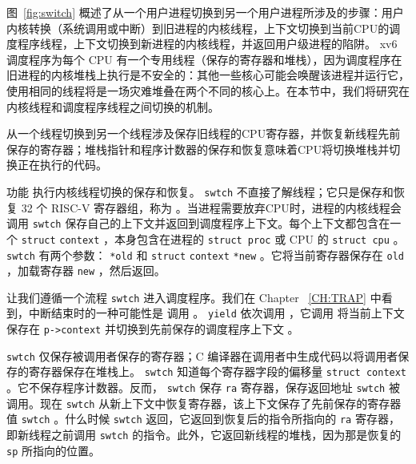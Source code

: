 图~\ref{fig:switch}   概述了从一个用户进程切换到另一个用户进程所涉及的步骤：用户内核转换（系统调用或中断）到旧进程的内核线程，上下文切换到当前CPU的调度程序线程，上下文切换到新进程的内核线程，并返回用户级进程的陷阱。 xv6 调度程序为每个 CPU 有一个专用线程（保存的寄存器和堆栈），因为调度程序在旧进程的内核堆栈上执行是不安全的：其他一些核心可能会唤醒该进程并运行它，使用相同的线程将是一场灾难堆叠在两个不同的核心上。在本节中，我们将研究在内核线程和调度程序线程之间切换的机制。  

从一个线程切换到另一个线程涉及保存旧线程的CPU寄存器，并恢复新线程先前保存的寄存器；堆栈指针和程序计数器的保存和恢复意味着CPU将切换堆栈并切换正在执行的代码。  

功能
        执行内核线程切换的保存和恢复。
    \lstinline{swtch}    不直接了解线程；它只是保存和恢复 32 个 RISC-V 寄存器组，称为
        。当进程需要放弃CPU时，进程的内核线程会调用
    \lstinline{swtch}    保存自己的上下文并返回到调度程序上下文。每个上下文都包含在一个
    \lstinline{struct}   
    \lstinline{context}   
        ，本身包含在进程的
    \lstinline{struct proc}    或 CPU 的
    \lstinline{struct cpu}    。
    \lstinline{swtch}    有两个参数：
    \lstinline{*old}    和
    \lstinline{struct}   
    \lstinline{context}   
    \lstinline{*new}    。它将当前寄存器保存在
    \lstinline{old}    ，加载寄存器
    \lstinline{new}    ，然后返回。  

让我们遵循一个流程
    \lstinline{swtch}    进入调度程序。我们在 Chapter~    \ref{CH:TRAP}    中看到，中断结束时的一种可能性是
        调用
        。
    \lstinline{yield}   依次调用
        ，它调用
        将当前上下文保存在
    \lstinline{p->context}    并切换到先前保存的调度程序上下文
        。  

   \lstinline{swtch}   
        仅保存被调用者保存的寄存器；C 编译器在调用者中生成代码以将调用者保存的寄存器保存在堆栈上。
    \lstinline{swtch}    知道每个寄存器字段的偏移量
    \lstinline{struct context}    。它不保存程序计数器。反而，
    \lstinline{swtch}    保存
    \lstinline{ra}   寄存器，保存返回地址
    \lstinline{swtch}    被调用。现在
    \lstinline{swtch}    从新上下文中恢复寄存器，该上下文保存了先前保存的寄存器值
    \lstinline{swtch}    。什么时候
    \lstinline{swtch}   返回，它返回到恢复后的指令所指向的
    \lstinline{ra}    寄存器，即新线程之前调用    \lstinline{swtch}    的指令。此外，它返回新线程的堆栈，因为那是恢复的    \lstinline{sp}    所指向的位置。  

